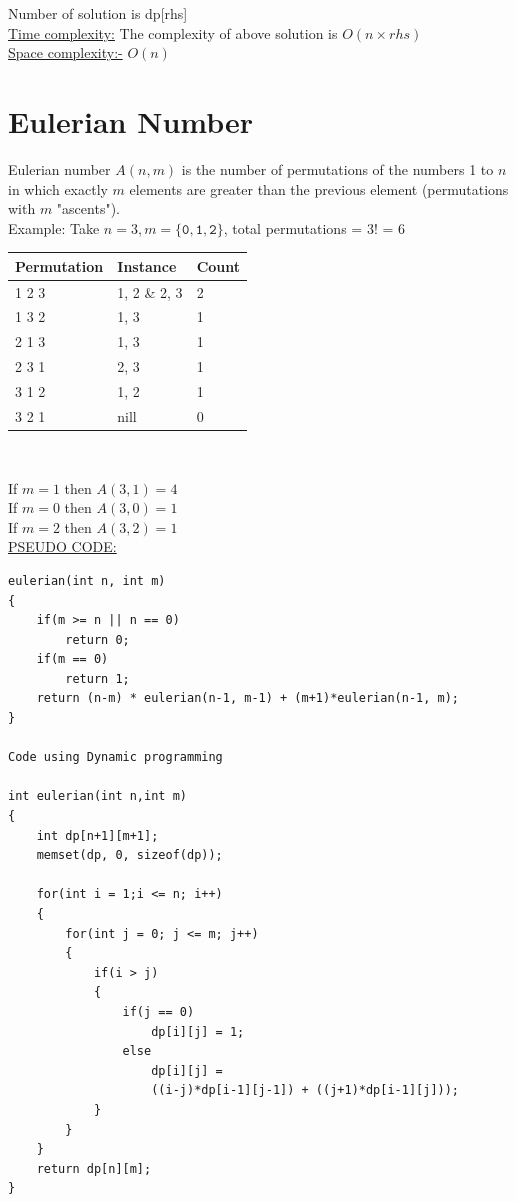 \documentclass[12pt]{book}
\begin{document}
Number of solution is dp[rhs]\\

\underline{Time complexity:} The complexity of above solution is $O(n \times rhs)$\\

\underline{Space complexity:-} $O(n)$\\


\section{Eulerian Number}
Eulerian number $A(n, m)$ is the number of permutations of the numbers 1 to $n$ in which exactly $m$ elements are greater than the previous element (permutations with $m$ "ascents").\\

Example:    Take $n = 3 , m = \mathtt{\{0, 1, 2\}}$, total permutations = 3! = 6\\

\begin{center}
\begin{tabular}{ | m{2.5cm} | m{2.5cm}| m{2cm} | } 
\hline
Permutation  & Instance & Count \\ 
\hline
1 2 3 & 1, 2 \& 2, 3 & 2\\
\hline
1 3 2 & 1, 3 & 1\\
\hline
2 1 3 & 1, 3 & 1\\
\hline
2 3 1 & 2, 3 & 1\\
\hline
3 1 2 & 1, 2 & 1\\
\hline
3 2 1 & nill & 0\\
\hline
\end{tabular}
\\
\end{center}

If $m = 1$ then $A(3, 1) = 4$\\
If $m = 0$ then $A(3, 0) = 1$\\
If $m = 2$ then $A(3, 2) = 1$\\

\underline{PSEUDO CODE:}\\

\begin{lstlisting}
eulerian(int n, int m)
{
    if(m >= n || n == 0)
        return 0;
    if(m == 0)
        return 1;
    return (n-m) * eulerian(n-1, m-1) + (m+1)*eulerian(n-1, m);
}

Code using Dynamic programming

int eulerian(int n,int m)
{
    int dp[n+1][m+1];
    memset(dp, 0, sizeof(dp));

    for(int i = 1;i <= n; i++)
    {
        for(int j = 0; j <= m; j++)
        {
            if(i > j)
            {
                if(j == 0)
                    dp[i][j] = 1;
                else
                    dp[i][j] = 
                    ((i-j)*dp[i-1][j-1]) + ((j+1)*dp[i-1][j]));
            }
        }
    }
    return dp[n][m];
}
\end{lstlisting}
\end{document}
